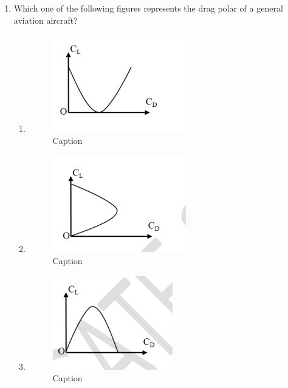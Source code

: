 \documentclass[journal,12pt,onecolumn]{IEEEtran}
\theoremstyle{remark}
\begin{document}
\begin{enumerate}
\item Which one of the following figures represents the drag polar of a general aviation aircraft?  

\begin{enumerate}
\item 

\begin{figure}[H]
    \centering
    \includegraphics[width=0.5\columnwidth]{figs/Screenshot from 2025-08-23 15-41-27.png}
    \caption{Caption}
    \label{fig:placeholder}
\end{figure}

\item 

\begin{figure}[H]
    \centering
    \includegraphics[width=0.5\columnwidth]{figs/Screenshot from 2025-08-23 15-42-43.png}
    \caption{Caption}
    \label{fig:placeholder}
\end{figure}

\item 

\begin{figure}[H]
    \centering
    \includegraphics[width=0.5\columnwidth]{figs/Screenshot from 2025-08-23 15-43-49.png}
    \caption{Caption}
    \label{fig:placeholder}
\end{figure}


\end{enumerate}
\end{enumerate}
\end{document}
